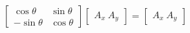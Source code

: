 \begin{equation}
\left[
\begin{array}{cc}
\cos\theta & \sin\theta\\
-\sin\theta & \cos\theta
\end{array}\right]
\left[
\begin{array}{c}
A_x \ 
A_y 
\end{array}
\right]
=\left[
\begin{array}{c}
A_{x} \ 
A_{y} 
\end{array}
\right]
\end{equation}